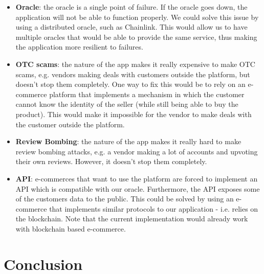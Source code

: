 \documentclass[12pt,a4paper,oneside]{article}
\theoremstyle{definition}
\begin{document}
\begin{itemize}
  \item {\bf{Oracle}}: the oracle is a single point of failure. If the oracle goes down, the application will not be able to function properly. We could solve this issue by using a distributed oracle, such as Chainlink. This would allow us to have multiple oracles that would be able to provide the same service, thus making the application more resilient to failures. 
  \item {\bf{OTC scams}}: the nature of the app makes it really expensive to make OTC scams, e.g. vendors making deals with customers outside the platform, but doesn't stop them completely. One way to fix this would be to rely on an e-commerce platform that implements a mechanism in which the customer cannot know the identity of the seller (while still being able to buy the product). This would make it impossible for the vendor to make deals with the customer outside the platform.
  \item {\bf{Review Bombing}}: the nature of the app makes it really hard to make review bombing attacks, e.g. a vendor making a lot of accounts and upvoting their own reviews. However, it doesn't stop them completely. 
  \item {\bf{API}}: e-commerces that want to use the platform are forced to implement an API which is compatible with our oracle. Furthermore, the API exposes some of the customers data to the public. This could be solved by using an e-commerce that implements similar protocols to our application - i.e. relies on the blockchain. Note that the current implementation would already work with blockchain based e-commerce.
\end{itemize}

\section{Conclusion}

\newpage
\end{document}
